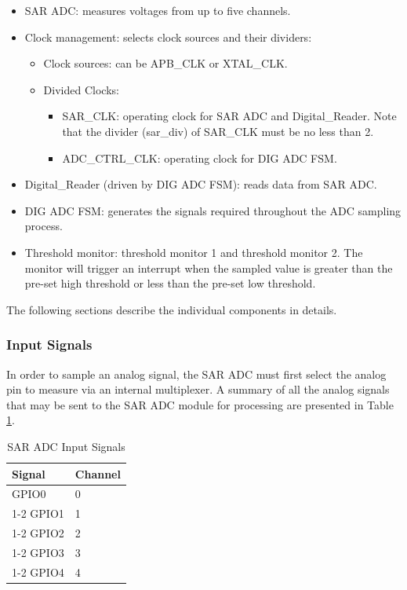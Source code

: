 \documentclass[main\_\_EN.tex]{subfiles}
\begin{document}
\begin{itemize}
    \item SAR ADC: measures voltages from up to five channels.
    \item Clock management: selects clock sources and their dividers:
        \begin{itemize}
            \item Clock sources: can be APB\_CLK or XTAL\_CLK.
            \item Divided Clocks:
             \begin{itemize}
                 \item SAR\_CLK: operating clock for SAR ADC and Digital\_Reader. Note that the divider (sar\_div) of SAR\_CLK must be no less than 2.
                 \item ADC\_CTRL\_CLK: operating clock for DIG ADC FSM.
             \end{itemize}
        \end{itemize}
    \item \label{other:sensor-item-read-data-from-sar-adc1} Digital\_Reader (driven by DIG ADC FSM): reads data from SAR ADC.
    \item DIG ADC FSM: generates the signals required throughout the ADC sampling process.
    \item Threshold monitor: threshold monitor 1 and threshold monitor 2. The monitor will trigger an interrupt when the sampled value is greater than the pre-set high threshold or less than the pre-set low threshold.
\end{itemize}
The following sections describe the individual components in details.

\subsubsection{Input Signals}

In order to sample an analog signal, the SAR ADC must first select the analog pin to measure via an internal multiplexer. A summary of all the analog signals that may be sent to the SAR ADC module for processing are presented in Table \ref{tab:sensor-sar-adc-input-signals}.

\begin{table}[H]
    \centering
    \caption{SAR ADC Input Signals}
    \label{tab:sensor-sar-adc-input-signals}
    \begin{tabular}[c]{|p{3cm}|p{1.5cm}|}
    \hline
    \rowcolor{lightgray}
    \textbf{Signal} & \textbf{Channel} \\
    \hline
    GPIO0       &  0  \\ \cline{1-2}
    GPIO1       &  1 \\ \cline{1-2}
    GPIO2       &  2 \\ \cline{1-2}
    GPIO3       &  3 \\ \cline{1-2}
    GPIO4       &  4 \\ \hline
\end{tabular}
\end{table}
\end{document}

